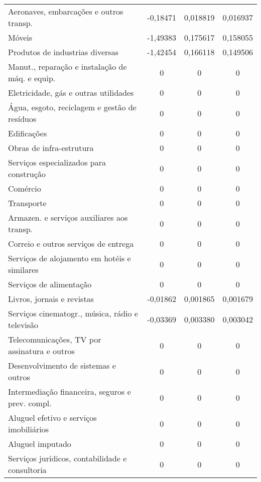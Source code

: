 \begin{apendicesenv}
\begin{small}
\begin{center}
\begin{longtable}{m{8cm}ccc}
				Aeronaves, embarcações e outros transp.            & -0,18471 & 0,018819 & 0,016937 \\
				Móveis                                             & -1,49383 & 0,175617 & 0,158055 \\
				Produtos de industrias diversas                    & -1,42454 & 0,166118 & 0,149506 \\
				Manut., reparação e instalação de máq. e equip.    & 0 & 0 & 0 \\
				Eletricidade, gás e outras   utilidades            & 0 & 0 & 0 \\
				Água, esgoto, reciclagem e   gestão de resíduos    & 0 & 0 & 0 \\
				Edificações                                        & 0 & 0 & 0 \\
				Obras de infra-estrutura                           & 0 & 0 & 0 \\
				Serviços especializados para construção            & 0 & 0 & 0 \\
				Comércio                                           & 0 & 0 & 0 \\
				Transporte                                         & 0 & 0 & 0 \\
				Armazen. e serviços auxiliares aos transp.         & 0 & 0 & 0 \\
				Correio e outros serviços de entrega               & 0 & 0 & 0 \\
				Serviços de alojamento em hotéis e similares       & 0 & 0 & 0 \\
				Serviços de alimentação                            & 0 & 0 & 0 \\
				Livros, jornais e revistas                         & -0,01862 & 0,001865 & 0,001679 \\
				Serviços cinematogr., música, rádio e televisão    & -0,03369 & 0,003380 & 0,003042 \\
				Telecomunicações, TV por assinatura e outros       & 0 & 0 & 0 \\
				Desenvolvimento de sistemas e outros               & 0 & 0 & 0 \\
				Intermediação financeira, seguros e prev. compl.   & 0 & 0 & 0 \\
				Aluguel efetivo e serviços imobiliários            & 0 & 0 & 0 \\
				Aluguel imputado                                   & 0 & 0 & 0 \\
				Serviços jurídicos, contabilidade e consultoria    & 0 & 0 & 0 \\

\end{longtable}
\end{center}
\end{small}
\end{apendicesenv}
